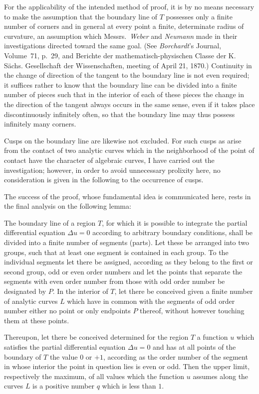 \documentclass{article}
\begin{document}
For the applicability of the intended method of proof, it is by no means necessary to make the assumption that the boundary line of $T$ possesses only a finite number of corners and in general at every point a finite, determinate radius of curvature, an assumption which Messrs.~\emph{Weber} and \emph{Neumann} made in their investigations directed toward the same goal. (See \emph{Borchardt}'s Journal, Volume~71, p.~29, and
Berichte der mathematisch-physischen Classe der K. Sächs. Gesellschaft der Wissenschaften, meeting of April 21, 1870.) Continuity in the change of direction of the tangent to the boundary line is not even required; it suffices rather to know that the boundary line can be divided into a finite number of pieces such that in the interior of each of these pieces the change in the direction of the tangent always occurs in the same sense, even if it takes place discontinuously infinitely often, so that the boundary line may thus possess infinitely many corners.

Cusps on the boundary line are likewise not excluded. For such cusps as arise from the contact of two analytic curves which in the neighborhood of the point of contact have the character of algebraic curves, I have carried out the investigation; however, in order to avoid unnecessary prolixity here, no consideration is given in the following to the occurrence of cusps.

The success of the proof, whose fundamental idea is communicated here, rests in the final analysis on the following lemma:

The boundary line of a region $T$, for which it is possible to integrate the partial differential equation $\Delta u = 0$ according to arbitrary boundary conditions, shall be divided into a finite number of segments (parts). Let these be arranged into two groups, such that at least one segment is contained in each group. To the individual segments let there be assigned, according as they belong to the first or second group, odd or even order numbers
and let the points that separate the segments with even order number from those with odd order number be designated by $P$. In the interior of $T$, let there be conceived given a finite number of analytic curves $L$ which have in common with the segments of odd order number either no point or only endpoints $P$ thereof, without however touching them at these points.

Thereupon, let there be conceived determined for the region $T$ a function $u$ which satisfies the partial differential equation $\Delta u = 0$ and has at all points of the boundary of $T$ the value $0$ or $+1$, according as the order number of the segment in whose interior the point in question lies is even or odd. Then the upper limit, respectively the maximum, of all values which the function $u$ assumes along the curves $L$ is a positive number $q$ which is less than $1$.
\end{document}

